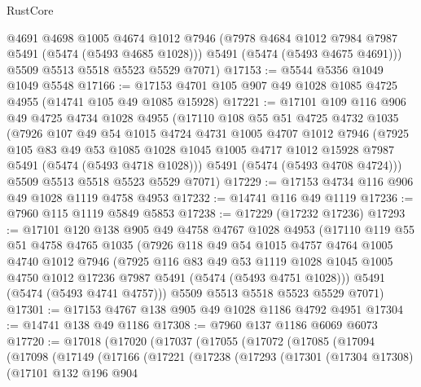 \begin{lexlean}{RustCore}
\begin{coremodule}
        @4691
        @4698
        @1005
        @4674
        @1012
        @7946
        (@7978 @4684 @1012 @7984 @7987 @5491 (@5474 (@5493 @4685 @1028)))
        @5491
        (@5474 (@5493 @4675 @4691)))
      @5509
      @5513
      @5518
      @5523
      @5529
      @7071)
@17153 := @5544 @5356 @1049 @1049 @5548
@17166 := @17153 @4701 @105 @907 @49 @1028 @1085 @4725 @4955 (@14741 @105 @49 @1085 @15928)
@17221 := @17101
    @109
    @116
    @906
    @49
    @4725
    @4734
    @1028
    @4955
    (@17110
      @108
      @55
      @51
      @4725
      @4732
      @1035
      (@7926
        @107
        @49
        @54
        @1015
        @4724
        @4731
        @1005
        @4707
        @1012
        @7946
        (@7925
          @105
          @83
          @49
          @53
          @1085
          @1028
          @1045
          @1005
          @4717
          @1012
          @15928
          @7987
          @5491
          (@5474 (@5493 @4718 @1028)))
        @5491
        (@5474 (@5493 @4708 @4724)))
      @5509
      @5513
      @5518
      @5523
      @5529
      @7071)
@17229 := @17153 @4734 @116 @906 @49 @1028 @1119 @4758 @4953
@17232 := @14741 @116 @49 @1119
@17236 := @7960 @115 @1119 @5849 @5853
@17238 := @17229 (@17232 @17236)
@17293 := @17101
    @120
    @138
    @905
    @49
    @4758
    @4767
    @1028
    @4953
    (@17110
      @119
      @55
      @51
      @4758
      @4765
      @1035
      (@7926
        @118
        @49
        @54
        @1015
        @4757
        @4764
        @1005
        @4740
        @1012
        @7946
        (@7925
          @116
          @83
          @49
          @53
          @1119
          @1028
          @1045
          @1005
          @4750
          @1012
          @17236
          @7987
          @5491
          (@5474 (@5493 @4751 @1028)))
        @5491
        (@5474 (@5493 @4741 @4757)))
      @5509
      @5513
      @5518
      @5523
      @5529
      @7071)
@17301 := @17153 @4767 @138 @905 @49 @1028 @1186 @4792 @4951
@17304 := @14741 @138 @49 @1186
@17308 := @7960 @137 @1186 @6069 @6073
@17720 := @17018
    (@17020
      (@17037
        (@17055
          (@17072
            (@17085
              (@17094
                (@17098
                  (@17149
                    (@17166
                      (@17221
                        (@17238
                          (@17293
                            (@17301
                              (@17304 @17308)
                              (@17101
                                @132
                                @196
                                @904

\end{coremodule}
\end{lexlean}
